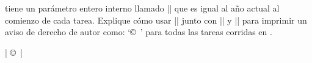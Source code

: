 

\bigskip

\enunciadoS {\TeX} tiene un par\'ametro entero interno llamado |\year|
que es igual al a\~no actual al comienzo de cada tarea. Explique
c\'omo usar |\year| junto con |\romannumeral| y |\uppercase| para
imprimir un aviso de derecho de autor como: `\copyright\
\uppercase\expandafter{\romannumeral\year}' para todas las tareas
corridas en \number\year.

\bigskip

\respuestaS | \copyright\
\uppercase\expandafter{\romannumeral\year}|

\bye

